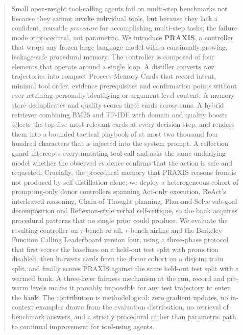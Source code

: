 \documentclass[conference]{IEEEtran}
\begin{document}
\begin{abstract}
Small open-weight tool-calling agents fail on multi-step benchmarks
not because they cannot invoke individual tools, but because they
lack a confident, reusable \emph{procedure} for accomplishing
multi-step tasks; the failure mode is procedural, not parametric.
We introduce \textbf{PRAXIS}, a controller that wraps any frozen
large language model with a continually growing, leakage-safe
procedural memory. The controller is composed of four elements that
operate around a single loop. A distiller converts raw trajectories
into compact Process Memory Cards that record intent, minimal tool
order, evidence prerequisites and confirmation points without ever
retaining personally identifying or argument-level content. A memory
store deduplicates and quality-scores these cards across runs. A
hybrid retriever combining BM25 and TF-IDF with domain and quality
boosts selects the top five most relevant cards at every decision
step, and renders them into a bounded tactical playbook of at most
two thousand four hundred characters that is injected into the
system prompt. A reflection guard intercepts every mutating tool
call and asks the same underlying model whether the observed
evidence confirms that the action is safe and requested. Crucially,
the procedural memory that PRAXIS reasons from is not produced by
self-distillation alone; we deploy a heterogeneous cohort of
prompting-only donor controllers spanning Act-only execution,
ReAct's interleaved reasoning, Chain-of-Thought planning,
Plan-and-Solve sub-goal decomposition and Reflexion-style verbal
self-critique, so the bank acquires procedural patterns that no
single prior could produce. We evaluate the resulting controller on
$\tau$-bench retail, $\tau$-bench airline and the Berkeley Function
Calling Leaderboard version four, using a three-phase protocol that
first scores the baselines on a held-out test split with promotion
disabled, then harvests cards from the donor cohort on a disjoint
train split, and finally scores PRAXIS against the same held-out
test split with a warmed bank. A three-layer fairness mechanism at
the run, record and pre-warm levels makes it provably impossible
for any test trajectory to enter the bank. The contribution is
methodological: zero gradient updates, no in-context examples drawn
from the evaluation distribution, no retrieval of benchmark answers,
and a strictly procedural rather than parametric path to continual
improvement for tool-using agents.
\end{abstract}
\end{document}
